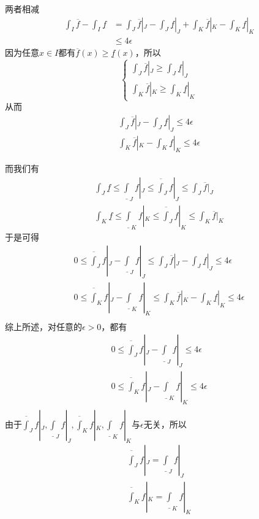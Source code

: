 \documentclass{article}
\begin{document}
\begin{itemize}
        两者相减
        \begin{align*}
          \int_I \overline{f} - \int_I \underline{f} & = \int_J \overline{f}|_J - \int_J \underline{f}|_J + \int_K \overline{f}|_K - \int_K \underline{f}|_K \\
                                                     & \leq 4\epsilon
        \end{align*}
        因为任意$x \in I$都有$\overline{f}(x) \geq \underline{f}(x)$，所以
        \begin{equation*}
          \begin{cases*}
            \int_J \overline{f}|_J \geq \int_J \underline{f}|_J \\
            \int_K \overline{f}|_K \geq \int_K \underline{f}|_K
          \end{cases*}
        \end{equation*}
        从而
        \begin{align*}
          \int_J \overline{f}|_J - \int_J \underline{f}|_J \leq 4\epsilon \\
          \int_K \overline{f}|_K - \int_K \underline{f}|_K \leq 4\epsilon
        \end{align*}

        而我们有
        \begin{align*}
          \int_J \underline{f} \leq \underline{\int}_J f|_J \leq \overline{\int}_J f|_J \leq \int_J \overline{f}|_J \\
          \int_K \underline{f} \leq \underline{\int}_K f|_K \leq \overline{\int}_J f|_K \leq \int_K \overline{f}|_K
        \end{align*}
        于是可得
        \begin{align*}
          0 \leq \overline{\int}_J f|_J - \underline{\int}_J f|_J \leq \int_J \overline{f}|_J - \int_J \underline{f}|_J \leq 4\epsilon \\
          0 \leq \overline{\int}_K f|_J - \underline{\int}_K f|_K \leq \int_K \overline{f}|_K - \int_K \underline{f}|_K \leq 4\epsilon \\
        \end{align*}
        综上所述，对任意的$\epsilon > 0$，都有
        \begin{align*}
          0 \leq \overline{\int}_J f|_J - \underline{\int}_J f|_J \leq 4\epsilon \\
          0 \leq \overline{\int}_K f|_J - \underline{\int}_K f|_K \leq 4\epsilon \\
        \end{align*}
        由于$\overline{\int}_J f|_J, \underline{\int}_J f|_J,\overline{\int}_K f|_K, \underline{\int}_K f|_K$与$\epsilon$无关，所以
        \begin{align*}
          \overline{\int}_J f|_J = \underline{\int}_J f|_J \\
          \overline{\int}_K f|_K = \underline{\int}_K f|_K \\
        \end{align*}


\end{itemize}
\end{document}

